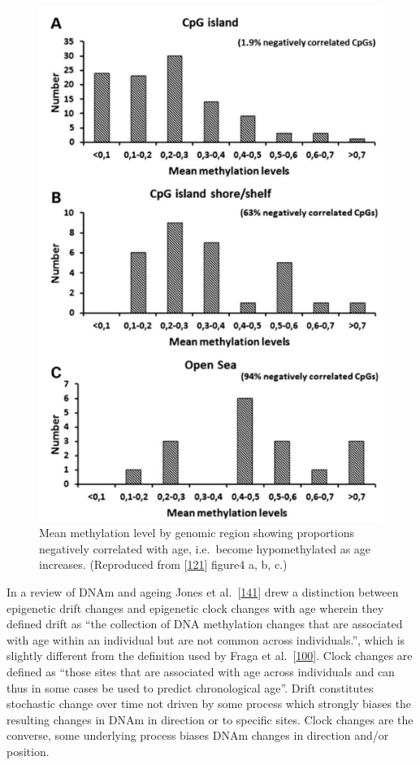 \documentclass[
]{book}
\begin{document}
\begin{figure}

{\centering \includegraphics[width=0.8\linewidth]{figs/Florath2014_F4abc} 

}

\caption{Mean methylation level by genomic region showing proportions negatively correlated with age, i.e.~become hypomethylated as age increases. (Reproduced from {[}\protect\hyperlink{ref-Florath2014}{121}{]} figure4 a, b, c.)}\label{fig:Florath2014F4abc}
\end{figure}



In a review of DNAm and ageing Jones et al.~{[}\protect\hyperlink{ref-Jones2015}{141}{]} drew a distinction between epigenetic drift changes and epigenetic clock changes with age wherein they defined drift as ``the collection of DNA methylation changes that are associated with age within an individual but are not common across individuals.'', which is slightly different from the definition used by Fraga et al.~{[}\protect\hyperlink{ref-Fraga2005}{100}{]}.
Clock changes are defined as ``those sites that are associated with age across individuals and can thus in some cases be used to predict chronological age''.
Drift constitutes stochastic change over time not driven by some process which strongly biases the resulting changes in DNAm in direction or to specific sites.
Clock changes are the converse, some underlying process biases DNAm changes in direction and/or position.
\end{document}
